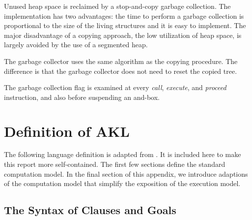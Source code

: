 Unused heap space is reclaimed by a stop-and-copy garbage collection.
The implementation has two advantages: the time to perform a garbage
collection is proportional to the size of the living structures and it
is easy to implement. The major disadvantage of a copying approach,
the low utilization of heap space, is largely avoided by the use of a
segmented heap.

The garbage collector uses the same algorithm as the copying
procedure. The difference is that the garbage collector does not need
to reset the copied tree. 

The garbage collection flag is examined at every {\em call}, {\em execute},
and {\em proceed} instruction, and also before suspending an and-box.


\appendix

\chapter{Definition of AKL} \label{app:akldef}

The following language definition is adapted from \cite{fra91PEPMA}.
It is included here to make this report more self-contained.  The
first few sections define the standard computation model.  In the
final section of this appendix, we introduce adaptions of the
computation model that simplify the exposition of the execution model.

\section{The Syntax of Clauses and Goals}\label{REF1}

